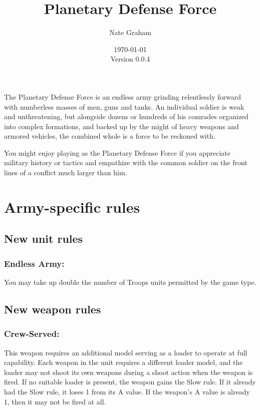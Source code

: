 








\title{Planetary Defense Force}
\author{Nate Graham}
\date{\today\\ Version 0.0.4}

\maketitle

The Planetary Defense Force is an endless army grinding relentlessly forward with numberless masses of men, guns and tanks. An individual soldier is weak and unthreatening, but alongside dozens or hundreds of his comrades organized into complex formations, and backed up by the might of heavy weapons and armored vehicles, the combined whole is a force to be reckoned with.

You might enjoy playing as the Planetary Defense Force if you appreciate military history or tactics and empathize with the common soldier on the front lines of a conflict much larger than him.

 

\section*{Army-specific rules}

\subsection*{New unit rules}

\subsubsection*{Endless Army:} You may take up double the number of Troops units permitted by the game type.

\subsection*{New weapon rules}

\subsubsection*{Crew-Served:} This weapon requires an additional model serving as a loader to operate at full capability. Each weapon in the unit requires a different loader model, and the loader may not shoot its own weapons during a shoot action when the weapon is fired. If no suitable loader is present, the weapon gains the Slow rule. If it already had the Slow rule, it loses 1 from its A value. If the weapon's A value is already 1, then it may not be fired at all.

